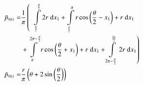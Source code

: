 \begin{align}
    \bar{p}_{\text{\tiny{NE1}}} =&\frac{1}{\pi} \left(\;\;\int\limits_{\frac{\pi}{2}}^{\frac{\theta}{2}}2 r\;\mathrm{d}x_{1}+\int\limits_{\frac{\theta}{2}}^{\pi}r \cos{\left (\frac{\theta}{2} - x_{1} \right )} + r\;\mathrm{d}x_{1}\right.\notag\\
 &\left.+\int\limits_{\pi}^{2 \pi - \frac{\theta}{2}}r \cos{\left (\frac{\theta}{2} + x_{1} \right )} + r\;\mathrm{d}x_{1}+\int\limits_{2 \pi - \frac{\theta}{2}}^{\frac{3 \pi}{2}}2 r\;\mathrm{d}x_{1}\right)\label{pNE1Def}\\
    \bar{p}_{\text{\tiny{NE1}}}  =& \frac{r}{\pi} \left(\theta + 2 \sin{\left (\frac{\theta}{2} \right )}\right)\label{pNE1Sln}
\end{align}